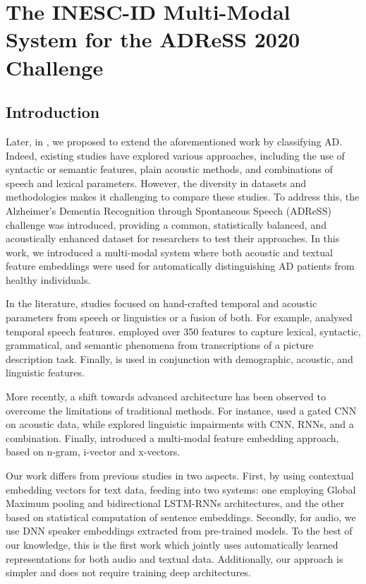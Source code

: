 \section{The INESC-ID Multi-Modal System for the ADReSS 2020 Challenge}
\subsection{Introduction}
Later, in \cite{pompili2020inesc}, we proposed to extend the aforementioned work by classifying \ac{AD}. Indeed, existing studies have explored various approaches, including the use of syntactic or semantic features, plain acoustic methods, and combinations of speech and lexical parameters. However, the diversity in datasets and methodologies makes it challenging to compare these studies. To address this, the Alzheimer's Dementia Recognition through Spontaneous Speech (ADReSS) challenge was introduced, providing a common, statistically balanced, and acoustically enhanced dataset for researchers to test their approaches. In this work, we introduced a multi-modal system where both acoustic and textual feature embeddings were used for automatically distinguishing \ac{AD} patients
from healthy individuals. 

In the literature, studies focused on hand-crafted temporal and acoustic parameters from speech or linguistics or a fusion of both. For example, \cite{konig2015automatic} analysed temporal speech features. \cite{fraser2016linguistic} employed over 350 features to capture lexical, syntactic, grammatical, and semantic phenomena from transcriptions of a picture description task. Finally, \cite{gosztolya2019identifying} is used in conjunction with demographic, acoustic, and linguistic features.

More recently, a shift towards advanced architecture has been observed to overcome the limitations of traditional methods. For instance, \cite{warnita18_interspeech} used a gated \ac{CNN} on acoustic data, while \cite{karlekar-etal-2018-detecting} explored linguistic impairments with \ac{CNN}, \acp{RNN}, and a combination. Finally, \cite{zargarbashi2019multi} introduced a multi-modal feature embedding approach, based on n-gram, i-vector and x-vectors.

Our work differs from previous studies in two aspects. First, by using contextual embedding vectors for text data, feeding into two systems: one employing Global Maximum pooling and bidirectional \ac{LSTM}-\acp{RNN} architectures, and the other based on statistical computation of sentence embeddings. Secondly, for audio, we use \ac{DNN} speaker embeddings extracted from pre-trained models. To the best of our knowledge, this is the first work which jointly uses automatically learned representations for both audio and textual data. Additionally, our approach is simpler and does not require training deep architectures.

